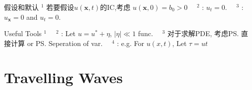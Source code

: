 \documentclass{note}
\begin{document}
\begin{MyTh}{假设和默认}
    \tiny $^1$ 若要假设$u(\mathbf{x},t)$的IC,考虑 $u(\mathbf{x},0)=b_0>0$  \ \ $^2$ : $u_t=0$. \ \ $^3$ : $u_{\mathbf{x}}=0$ and $u_t=0$.
\end{MyTh}

\begin{MyTh}{Useful Tools}
    \tiny $^1$ \ \ $^2$ : Let $u=u^*+\eta$, $|\eta|\ll1$ func. \ \ $^3$ 对于求解PDE, 考虑\ps{\tiny 直接计算} or \ps{\tiny Seperation of var.} \ \ $^4$ : e.g. For $u(x,t)$, Let $\tau=u t$
\end{MyTh}


\section{Travelling Waves}
\end{document}
